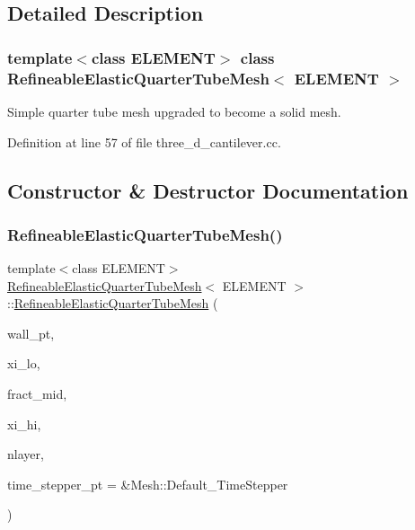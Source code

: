 \subsection{Detailed Description}
\subsubsection*{template$<$class E\+L\+E\+M\+E\+NT$>$\newline
class Refineable\+Elastic\+Quarter\+Tube\+Mesh$<$ E\+L\+E\+M\+E\+N\+T $>$}

Simple quarter tube mesh upgraded to become a solid mesh. 

Definition at line 57 of file three\+\_\+d\+\_\+cantilever.\+cc.



\subsection{Constructor \& Destructor Documentation}
\mbox{\label{classRefineableElasticQuarterTubeMesh_a97c25a8845b2d8ab2a4aef1c0407bacd}} 
\subsubsection{\texorpdfstring{Refineable\+Elastic\+Quarter\+Tube\+Mesh()}{RefineableElasticQuarterTubeMesh()}}
{\footnotesize\ttfamily template$<$class E\+L\+E\+M\+E\+NT$>$ \\
\hyperlink{classRefineableElasticQuarterTubeMesh}{Refineable\+Elastic\+Quarter\+Tube\+Mesh}$<$ E\+L\+E\+M\+E\+NT $>$\+::\hyperlink{classRefineableElasticQuarterTubeMesh}{Refineable\+Elastic\+Quarter\+Tube\+Mesh} (\begin{DoxyParamCaption}\item[{Geom\+Object $\ast$}]{wall\+\_\+pt,  }\item[{const Vector$<$ double $>$ \&}]{xi\+\_\+lo,  }\item[{const double \&}]{fract\+\_\+mid,  }\item[{const Vector$<$ double $>$ \&}]{xi\+\_\+hi,  }\item[{const unsigned \&}]{nlayer,  }\item[{Time\+Stepper $\ast$}]{time\+\_\+stepper\+\_\+pt = {\ttfamily \&Mesh\+:\+:Default\+\_\+TimeStepper} }\end{DoxyParamCaption})\hspace{0.3cm}{\ttfamily [inline]}}



